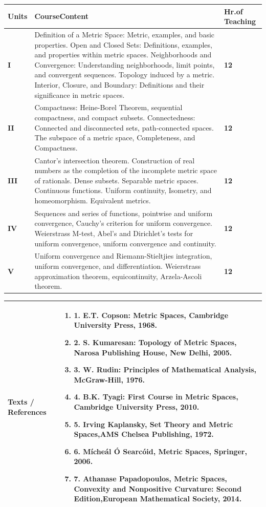 \documentclass[11pt,a4paper]{article}
\begin{document}
\begin{tabularx}{\textwidth}{|>{\centering\arraybackslash}p{1.4cm}|X|>{\centering\arraybackslash}p{2.4cm}|}
\hline
\textbf{\Large Units} & \textbf{\Large CourseContent} & \textbf{\Large Hr.of Teaching} \\
\hline
\Large \textbf{I} & Definition of a Metric Space: Metric, examples, and basic properties. Open and Closed Sets: Definitions, examples, and properties within metric spaces. Neighborhoods and Convergence: Understanding neighborhoods, limit points, and convergent sequences. Topology induced by a metric. Interior, Closure, and Boundary: Definitions and their significance in metric spaces. & \Large \textbf{12} \\
\hline
\Large \textbf{II} & Compactness: Heine-Borel Theorem, sequential compactness, and compact subsets. Connectedness: Connected and disconnected sets, path-connected spaces. The subspace of a metric space, Completeness, and Compactness. & \Large \textbf{12} \\
\hline
\Large \textbf{III} & Cantor's intersection theorem. Construction of real numbers as the completion of the incomplete metric space of rationals. Dense subsets. Separable metric spaces. Continuous functions. Uniform continuity, Isometry, and homeomorphism. Equivalent metrics. & \Large \textbf{12} \\
\hline
\Large \textbf{IV} & Sequences and series of functions, pointwise and uniform convergence, Cauchy's criterion for uniform convergence. Weierstrass M-test, Abel's and Dirichlet's tests for uniform convergence, uniform convergence and continuity. & \Large \textbf{12} \\
\hline
\Large \textbf{V} & Uniform convergence and Riemann-Stieltjies integration, uniform convergence, and differentiation. Weierstrass approximation theorem, equicontinuity, Arzela-Ascoli theorem. & \Large \textbf{12} \\
\hline
\end{tabularx}
\vspace{8pt}
\renewcommand{\arraystretch}{1.3}
\begin{tabularx}{\textwidth}{|p{3.2cm}|X|}
\hline
\textbf{Texts / References} & \begin{enumerate}[leftmargin=*,noitemsep,topsep=2pt]  \item 1. E.T. Copson: Metric Spaces, Cambridge University Press, 1968.  \item 2. S. Kumaresan: Topology of Metric Spaces, Narosa Publishing House, New Delhi, 2005.  \item 3. W. Rudin: Principles of Mathematical Analysis, McGraw-Hill, 1976.  \item 4. B.K. Tyagi: First Course in Metric Spaces, Cambridge University Press, 2010.  \item 5. Irving Kaplansky, Set Theory and Metric Spaces,AMS Chelsea Publishing, 1972.  \item 6. Mícheál Ó Searcóid, Metric Spaces, Springer, 2006.  \item 7. Athanase Papadopoulos, Metric Spaces, Convexity and Nonpositive Curvature: Second  Edition,European Mathematical Society, 2014.\end{enumerate} \\
\hline
\end{tabularx}
\end{document}
